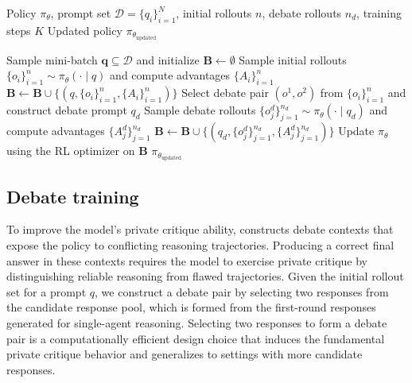 \begin{algorithm}[t]
\footnotesize
\caption{Self-Debate Reinforcement Learning (\SDRL{})}
\label{alg:sdrl}
\vspace{-0.4em}
\begin{algorithmic}[1]
\Require Policy $\pi_\theta$, prompt set $\mathcal{D}=\{q_i\}_{i=1}^N$, initial rollouts $n$, debate rollouts $n_d$, training steps $K$
\Ensure Updated policy $\pi_{\theta_{\mathrm{updated}}}$

  \State Sample mini-batch $\mathbf{q}\subseteq\mathcal{D}$ and initialize $\mathbf{B}\leftarrow\emptyset$
    \State Sample initial rollouts $\{o_i\}_{i=1}^n\sim\pi_\theta(\cdot\mid q)$ and compute advantages $\{A_i\}_{i=1}^n$
    \State $\mathbf{B}\leftarrow \mathbf{B}\cup\{(q,\{o_i\}_{i=1}^n,\{A_i\}_{i=1}^n)\}$
    \State Select debate pair $(o^1,o^2)$ from $\{o_i\}_{i=1}^n$ and construct debate prompt $q_d$
    \State Sample debate rollouts $\{o_j^d\}_{j=1}^{n_d}\sim\pi_\theta(\cdot\mid q_d)$ and compute advantages $\{A_j^d\}_{j=1}^{n_d}$
    \State $\mathbf{B}\leftarrow \mathbf{B}\cup\{(q_d,\{o_j^d\}_{j=1}^{n_d},\{A_j^d\}_{j=1}^{n_d})\}$
  \EndFor
  \State Update $\pi_\theta$ using the RL optimizer on $\mathbf{B}$
\EndFor
\State \Return $\pi_{\theta_{\mathrm{updated}}}$
\end{algorithmic}
\vspace{-0.3em}
\end{algorithm}

\subsection{Debate training}
\label{subsec:debate_ability}

To improve the model's private critique ability, \SDRL{} constructs debate contexts that expose the policy to conflicting reasoning trajectories. Producing a correct final answer in these contexts requires the model to exercise private critique by distinguishing reliable reasoning from flawed trajectories. Given the initial rollout set for a prompt $q$, we construct a debate pair by selecting two responses from the candidate response pool, which is formed from the first-round responses generated for single-agent reasoning. Selecting two responses to form a debate pair is a computationally efficient design choice that induces the fundamental private critique behavior and generalizes to settings with more candidate responses.

